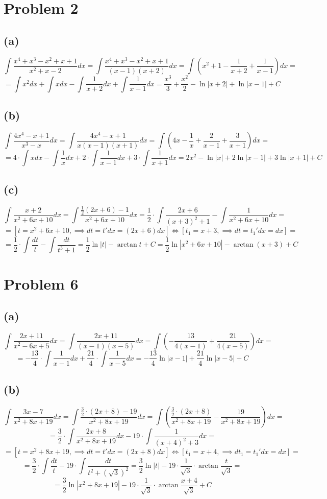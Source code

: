 \documentclass{article}
\begin{document}
\section*{Problem 2}
\subsection*{(a)}
$$\int\frac{x^4 + x^3 - x^2 + x + 1}{x^2 + x - 2}dx = \int\frac{x^4 + x^3 - x^2 + x + 1}{(x - 1)(x + 2)}dx = \int\left(x^2 + 1 - \frac{1}{x + 2} + \frac{1}{x - 1}\right)dx = $$
$$ = \int x^2dx + \int xdx - \int\frac{1}{x + 2}dx + \int\frac{1}{x - 1}dx = \frac{x^3}{3} + \frac{x^2}{2} - \ln{|x + 2|} + \ln{|x - 1|} + C$$
\subsection*{(b)}
$$\int\frac{4x^4 - x + 1}{x^3 - x}dx = \int\frac{4x^4 - x + 1}{x(x - 1)(x + 1)}dx = \int\left(4x - \frac{1}{x} + \frac{2}{x - 1} + \frac{3}{x + 1}\right)dx = $$
$$ = 4\cdot\int xdx - \int\frac{1}{x}dx + 2\cdot\int\frac{1}{x - 1}dx + 3\cdot\int\frac{1}{x + 1}dx = 2x^2 - \ln{|x|} + 2\ln{|x - 1|} + 3\ln{|x + 1|} + C$$
\subsection*{(c)}
$$\int\frac{x + 2}{x^2 + 6x + 10}dx = \int\frac{\frac{1}{2}(2x + 6) - 1}{x^2 + 6x + 10}dx = \frac{1}{2}\cdot\int\frac{2x + 6}{(x + 3)^2 + 1} - \int\frac{1}{x^2 + 6x + 10}dx = $$
$$ = [t = x^2 + 6x + 10,\implies dt = t'dx = (2x + 6)dx]\iff[t_1 = x + 3,\implies dt = t_1'dx = dx] = $$
$$ = \frac{1}{2}\cdot\int\frac{dt}{t} - \int\frac{dt}{t^3 + 1} = \frac{1}{2}\ln{|t|} - \arctan{t} + C = \frac{1}{2}\ln{|x^2 + 6x + 10|} - \arctan{(x + 3)} + C$$
\section*{Problem 6}
\subsection*{(a)}
$$\int\frac{2x + 11}{x^2 - 6x + 5}dx = \int\frac{2x + 11}{(x - 1)(x - 5)}dx = \int\left(-\frac{13}{4(x - 1)} + \frac{21}{4(x - 5)}\right)dx = $$
$$ = -\frac{13}{4}\cdot\int\frac{1}{x - 1}dx + \frac{21}{4}\cdot\int\frac{1}{x - 5}dx = -\frac{13}{4}\ln{|x - 1|} + \frac{21}{4}\ln{|x - 5|} + C$$
\subsection*{(b)}
$$\int\frac{3x - 7}{x^2 + 8x + 19}dx = \int\frac{\frac{3}{2}\cdot(2x + 8) - 19}{x^2 + 8x + 19}dx = \int\left(\frac{\frac{3}{2}\cdot(2x + 8)}{x^2 + 8x + 19} - \frac{19}{x^2 + 8x + 19}\right)dx = $$
$$ = \frac{3}{2}\cdot\int\frac{2x + 8}{x^2 + 8x + 19}dx - 19\cdot\int\frac{1}{(x + 4)^2 + 3}dx =$$
$$= [t = x^2 + 8x + 19,\implies dt = t'dx = (2x + 8)dx]\iff[t_1 = x + 4,\implies dt_1 = t_1'dx = dx] = $$
$$ = \frac{3}{2}\cdot\int\frac{dt}{t} - 19\cdot\int\frac{dt}{t^2 + (\sqrt{3})^2} = \frac{3}{2}\ln{|t|} - 19\cdot\frac{1}{\sqrt{3}}\cdot\arctan{\frac{t}{\sqrt{3}}} = $$
$$ = \frac{3}{2}\ln{|x^2 + 8x + 19|} - 19\cdot\frac{1}{\sqrt{3}}\cdot\arctan{\frac{x + 4}{\sqrt{3}}} + C $$
\end{document}
